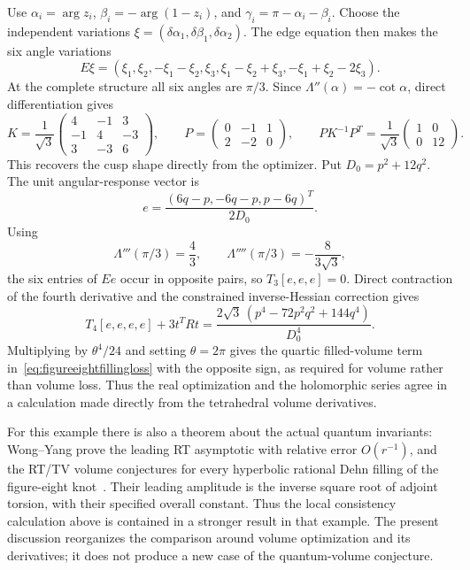 Use $\alpha_i=\arg z_i$, $\beta_i=-\arg(1-z_i)$, and
$\gamma_i=\pi-\alpha_i-\beta_i$. Choose the independent variations
$\xi=(\delta\alpha_1,\delta\beta_1,\delta\alpha_2)$.
The edge equation then makes the six angle variations
\[
 E\xi=(\xi_1,\xi_2,-\xi_1-\xi_2,
       \xi_3,\xi_1-\xi_2+\xi_3,-\xi_1+\xi_2-2\xi_3).
\]
At the complete structure all six angles are $\pi/3$.
Since $\Lambda''(\alpha)=-\cot\alpha$, direct differentiation gives
\begin{equation}
 K=\frac1{\sqrt3}
 \begin{pmatrix}4&-1&3\\-1&4&-3\\3&-3&6\end{pmatrix},\qquad
 P=\begin{pmatrix}0&-1&1\\2&-2&0\end{pmatrix},\qquad
 P K^{-1}P^T=\frac1{\sqrt3}
 \begin{pmatrix}1&0\\0&12\end{pmatrix}.
 \label{eq:figureeightdirectHessian}
\end{equation}
This recovers the cusp shape directly from the optimizer.
Put $D_0=p^2+12q^2$. The unit angular-response vector is
\[
 e=\frac{(6q-p,-6q-p,p-6q)^T}{2D_0}.
\]
Using
\[
 \Lambda'''(\pi/3)=\frac43,\qquad
 \Lambda''''(\pi/3)=-\frac8{3\sqrt3},
\]
the six entries of $Ee$ occur in opposite pairs, so
$T_3[e,e,e]=0$. Direct contraction of the fourth derivative and
the constrained inverse-Hessian correction gives
\begin{equation}
 T_4[e,e,e,e]+3t^TRt
   =\frac{2\sqrt3\,(p^4-72p^2q^2+144q^4)}{D_0^4}.
 \label{eq:figureeightdirectquartic}
\end{equation}
Multiplying by $\theta^4/24$ and setting $\theta=2\pi$ gives
the quartic filled-volume term in~\eqref{eq:figureeightfillingloss}
with the opposite sign, as required for volume rather than volume loss.
Thus the real optimization and the holomorphic series agree in a
calculation made directly from the tetrahedral volume derivatives.

For this example there is also a theorem about the actual quantum
invariants: Wong--Yang prove the leading RT asymptotic with relative
error $O(r^{-1})$, and the
RT/TV volume conjectures for every hyperbolic rational Dehn filling
of the figure-eight knot~\cite[Theorems 1.1 and 1.2]{WongYangDehn}.
Their leading amplitude is the inverse square root of adjoint torsion,
with their specified overall constant. Thus the local consistency
calculation above is contained in a stronger result in that example.
The present discussion reorganizes the comparison around volume
optimization and its derivatives; it does not produce a new case
of the quantum-volume conjecture.

